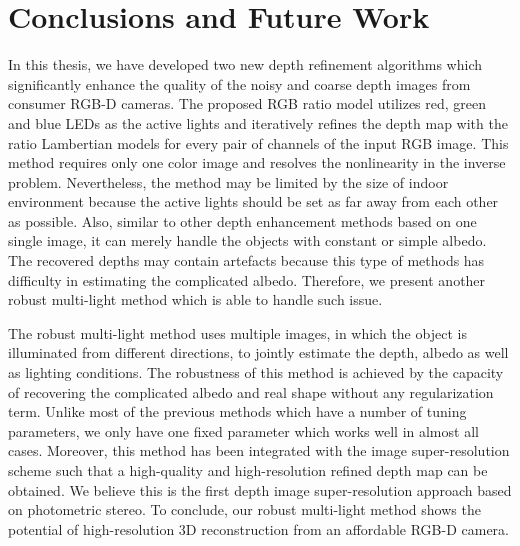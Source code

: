 \chapter{Conclusions and Future Work} \label{chap:conclusion}

In this thesis, we have developed two new depth refinement algorithms which significantly enhance the quality of the noisy and coarse depth images from consumer RGB-D cameras. 
The proposed RGB ratio model utilizes red, green and blue LEDs as the active lights and iteratively refines the depth map with the ratio Lambertian models for every pair of channels of the input RGB image. 
This method requires only one color image and resolves the nonlinearity in the inverse problem.
Nevertheless, the method may be limited by the size of indoor environment because the active lights should be set as far away from each other as possible.
Also, similar to other depth enhancement methods based on one single image, it can merely handle the objects with constant or simple albedo.
The recovered depths may contain artefacts because this type of methods has difficulty in estimating the complicated albedo.
Therefore, we present another robust multi-light method which is able to handle such issue.

The robust multi-light method uses multiple images, in which the object is illuminated from different directions, to jointly estimate the depth, albedo as well as lighting conditions.
The robustness of this method is achieved by the capacity of recovering the complicated albedo and real shape without any regularization term.
Unlike most of the previous methods which have a number of tuning parameters, we only have one fixed parameter which works well in almost all cases.  
Moreover, this method has been integrated with the image super-resolution scheme such that a high-quality and high-resolution refined depth map can be obtained.
We believe this is the first depth image super-resolution approach based on photometric stereo.
To conclude, our robust multi-light method shows the potential of high-resolution 3D reconstruction from an affordable RGB-D camera.

